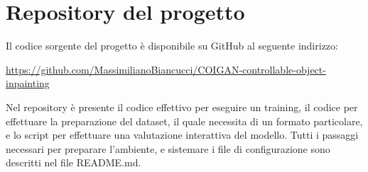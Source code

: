 \section{Repository del progetto}
Il codice sorgente del progetto è disponibile su GitHub al seguente indirizzo: 

\url{https://github.com/MassimilianoBiancucci/COIGAN-controllable-object-inpainting}

Nel repository è presente il codice effettivo per eseguire un training, il codice per effettuare la preparazione del
dataset, il quale necessita di un formato particolare, e lo script per effettuare una valutazione interattiva del modello.
Tutti i passaggi necessari per preparare l'ambiente, e sistemare i file di configurazione sono descritti nel file README.md.

